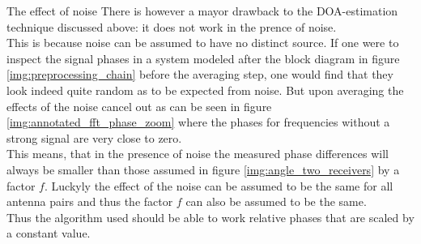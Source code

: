\begin{subchapter}{The effect of noise}
  There is however a mayor drawback to the DOA-estimation
  technique discussed above: it does not work in the prence of noise. \\

  This is because noise can be assumed to have no distinct source.
  If one were to inspect the signal phases in a system modeled after
  the block diagram in figure \ref{img:preprocessing_chain} before
  the averaging step, one would find that they look indeed quite random
  as to be expected from noise.
  But upon averaging the effects of the noise cancel out as can be seen in figure
  \ref{img:annotated_fft_phase_zoom} where the phases for frequencies
  without a strong signal are very close to zero. \\

  This means, that in the presence of noise the measured phase differences
  will always be smaller than those assumed in figure \ref{img:angle_two_receivers}
  by a factor $f$.
  Luckyly the effect of the noise can be assumed to be the same for
  all antenna pairs and thus the factor $f$ can also be assumed to be the same. \\

  Thus the algorithm used should be able to work relative phases that are
  scaled by a constant value.
\end{subchapter}
